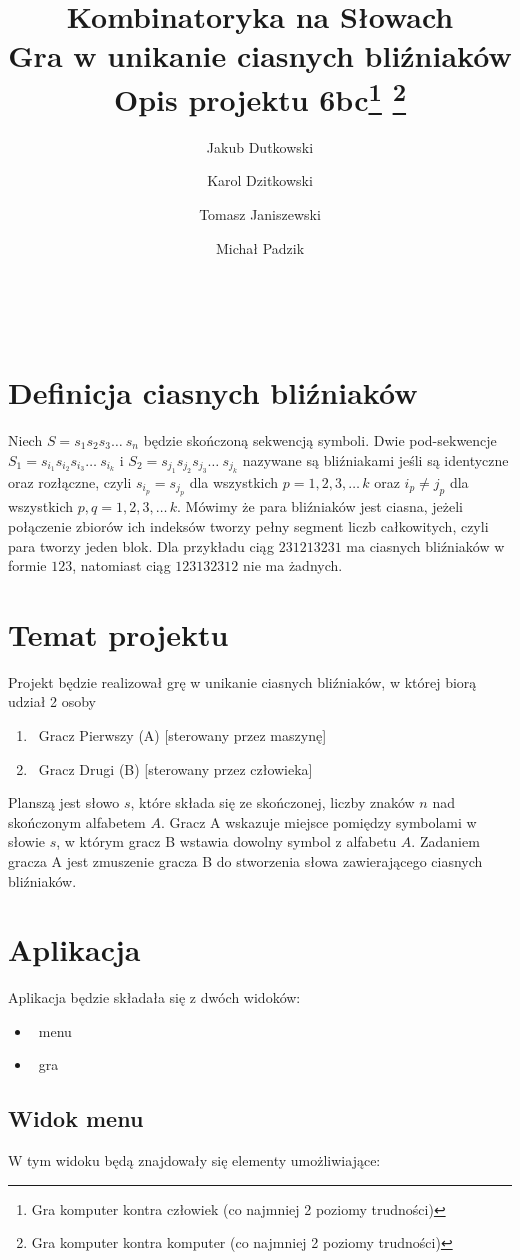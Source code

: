 \documentclass[11pt,a4paper]{article}
\author{Jakub Dutkowski}
\author{Karol Dzitkowski}
\author{Tomasz Janiszewski}
\author{Michał Padzik}
\affil{Wydział Matematyki i Nauk Informacyjnych, Politechnika Warszawska}
\title{
	Kombinatoryka na Słowach\\
	Gra w unikanie ciasnych bliźniaków\\
	Opis projektu
	6bc\footnote{Gra komputer kontra człowiek (co najmniej 2 poziomy trudności)}
\footnote{Gra komputer kontra komputer (co najmniej 2 poziomy trudności)}
 }
\begin{document}
\maketitle\
\newpage\


\section{Definicja ciasnych bliźniaków}
Niech $S = s_1 s_2 s_3 \ldots\ s_n$ będzie skończoną sekwencją symboli. Dwie pod-sekwencje
$S_1 = s_{i_1} s_{i_2} s_{i_3} \ldots\ s_{i_k}$ i $S_2 = s_{j_1} s_{j_2} s_{j_3} \ldots\ s_{j_k}$
nazywane są bliźniakami jeśli są identyczne oraz rozłączne, czyli $s_{i_p} = s_{j_p}$ dla 
wszystkich $p = {1, 2, 3, \ldots\, k}$ oraz $ i_p \neq j_p $ dla wszystkich $ p,q = {1, 2, 3, \ldots\, k}$.
Mówimy że para bliźniaków jest ciasna, jeżeli połączenie zbiorów ich indeksów tworzy pełny segment
liczb całkowitych, czyli para tworzy jeden blok. Dla przykładu ciąg $231213231$ ma ciasnych bliźniaków
w formie $123$, natomiast ciąg $123132312$ nie ma żadnych.

\section{Temat projektu}
Projekt będzie realizował grę w unikanie ciasnych bliźniaków,
w której biorą udział 2 osoby 
\begin{enumerate}
	\item\ Gracz Pierwszy (A) [sterowany przez maszynę]
	\item\ Gracz Drugi (B) [sterowany przez człowieka]
\end{enumerate}
Planszą jest słowo $s$, które składa się ze skończonej,
liczby znaków $n$ nad skończonym alfabetem $A$.
Gracz A wskazuje miejsce pomiędzy symbolami w słowie $s$, w którym gracz B
wstawia dowolny symbol z alfabetu $A$.
Zadaniem gracza A jest zmuszenie gracza B do stworzenia 
słowa zawierającego ciasnych bliźniaków.

\section{Aplikacja}
Aplikacja będzie składała się z dwóch widoków:
\begin{itemize}
 \item\ menu
 \item\ gra
\end{itemize}

\subsection{Widok menu}
W tym widoku będą znajdowały się elementy umożliwiające:
\end{document}
